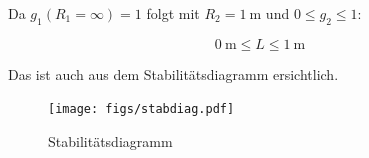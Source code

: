 \documentclass[slug=GL, room=HZDR\ Dresden/Rossendorf\,\ Geb.\ 620/123, supervisor=Martin\ Rehwald;\, Tim\ Ziegler]{../../Lab_Report_LaTeX/lab_report}
\begin{document}
Da \(g_1(R_1=\infty)=1\) folgt mit \(R_2=\SI{1}{\meter}\) und \(0\leq g_2\leq 1\):

\begin{equation}
  \label{eq:stabber}
  \SI{0}{\meter}\leq L \leq \SI{1}{\meter}
\end{equation}

Das ist auch aus dem Stabilit\"atsdiagramm ersichtlich.
\begin{figure}[H]\centering
  \texttt{[image: figs/stabdiag.pdf]}
  \caption[Gauss]{Stabilit\"atsdiagramm}
  \label{fig:stabdiag}
\end{figure}
\end{document}
